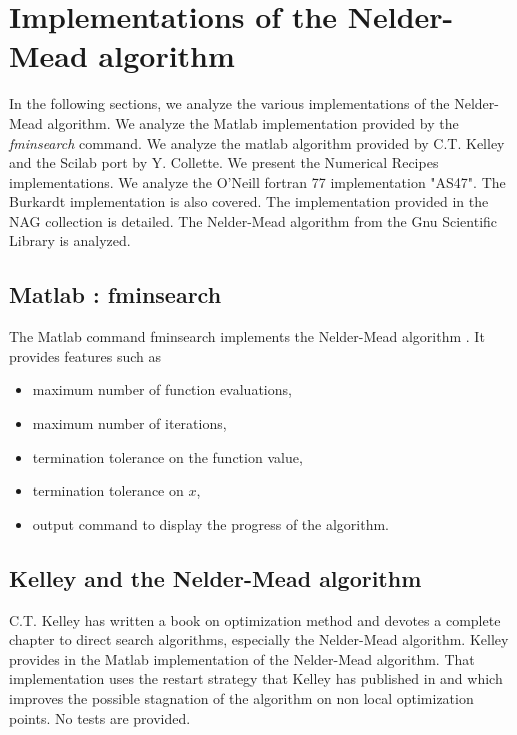 %

\chapter{Implementations of the Nelder-Mead algorithm}

In the following sections, we analyze the various implementations of the 
Nelder-Mead algorithm. We analyze the Matlab implementation provided 
by the \emph{fminsearch} command. We analyze the matlab algorithm provided by 
C.T. Kelley and the Scilab port by Y. Collette. We 
present the Numerical Recipes implementations. We analyze the O'Neill 
fortran 77 implementation "AS47". The Burkardt implementation is also covered.
The implementation provided in the NAG collection is detailed.
The Nelder-Mead algorithm from the Gnu Scientific Library is analyzed.

\section{Matlab : fminsearch}

The Matlab command fminsearch implements the Nelder-Mead algorithm \cite{MatlabFminsearch}. 
It provides features such as 
\begin{itemize}
\item maximum number of function evaluations,
\item maximum number of iterations,
\item termination tolerance on the function value,
\item termination tolerance on $x$,
\item output command to display the progress of the algorithm.
\end{itemize}

\section{Kelley and the Nelder-Mead algorithm}

C.T. Kelley has written a book \cite{Kelley1999} on optimization method and devotes a 
complete chapter to direct search algorithms, especially the Nelder-Mead 
algorithm. Kelley provides in \cite{KelleyMethodsOptimizationMatlabCodes} 
the Matlab implementation of the 
Nelder-Mead algorithm. That implementation uses the restart strategy 
that Kelley has published in \cite{589283} and which improves the possible 
stagnation of the algorithm on non local optimization points. No tests 
are provided.


